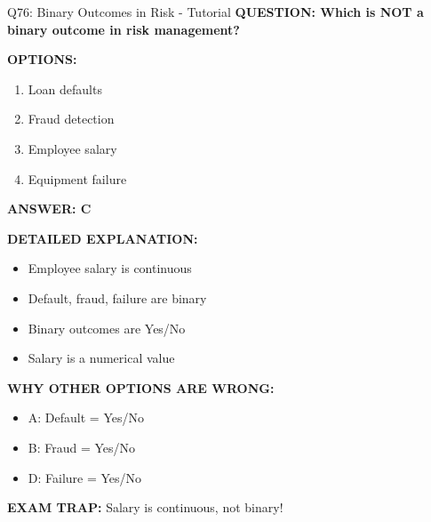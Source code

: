 \documentclass[8pt]{beamer}
\begin{document}
	\begin{frame}{Q76: Binary Outcomes in Risk - Tutorial}
		\fontsize{6.5}{7.5}\selectfont
		\textbf{QUESTION: Which is NOT a binary outcome in risk management?}
		
		\vspace{0.1cm}
		\textbf{OPTIONS:}
		\begin{enumerate}
			\item Loan defaults
			\item Fraud detection
			\item Employee salary
			\item Equipment failure
		\end{enumerate}
		
		\vspace{0.1cm}
		\textcolor{myblue}{\textbf{ANSWER: C}}
		
		\vspace{0.1cm}
		\textbf{DETAILED EXPLANATION:}
		\begin{itemize}
			\item Employee salary is continuous
			\item Default, fraud, failure are binary
			\item Binary outcomes are Yes/No
			\item Salary is a numerical value
		\end{itemize}
		
		\vspace{0.1cm}
		\textcolor{myred}{\textbf{WHY OTHER OPTIONS ARE WRONG:}}
		\begin{itemize}
			\item \textcolor{myred}{A:} Default = Yes/No
			\item \textcolor{myred}{B:} Fraud = Yes/No
			\item \textcolor{myred}{D:} Failure = Yes/No
		\end{itemize}
		
		\textcolor{myred}{\textbf{EXAM TRAP:}} Salary is \textcolor{myblue}{continuous}, not binary!
	\end{frame}
	
\end{document}
